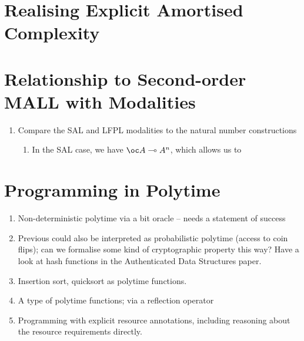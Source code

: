 \documentclass[acmsmall,review]{acmart}
\begin{document}
\begin{theorem}
  \label{thm:lfpl-soundness}
\end{theorem}

\section{Realising Explicit Amortised Complexity}
\label{sec:explicit-amortised-complexity}

\section{Relationship to Second-order MALL with Modalities}
\label{sec:poly-mall}

\begin{enumerate}
\item Compare the SAL and LFPL modalities to the natural number
  constructions
  \begin{enumerate}
  \item In the SAL case, we have $\oc A \multimap A^n$, which allows
    us to
  \end{enumerate}
\end{enumerate}



\section{Programming in Polytime}
\label{sec:programming-polytime}

\begin{enumerate}
\item Non-deterministic polytime via a bit oracle -- needs a statement
  of success
\item Previous could also be interpreted as probabilistic polytime
  (access to coin flips); can we formalise some kind of cryptographic
  property this way? Have a look at hash functions in the
  Authenticated Data Structures paper.
\item Insertion sort, quicksort as polytime functions.
\item A type of polytime functions; via a reflection operator
\item Programming with explicit resource annotations, including
  reasoning about the resource requirements directly.
\end{enumerate}
\end{document}
